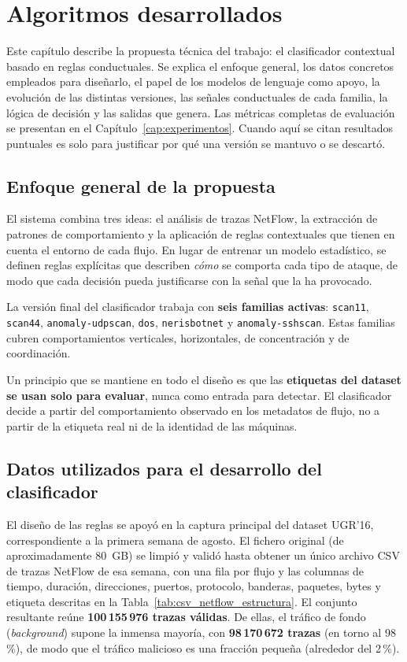 \chapter{Algoritmos desarrollados}
\label{cap:algoritmos}

Este capítulo describe la propuesta técnica del trabajo: el clasificador contextual basado en reglas conductuales. Se explica el enfoque general, los datos concretos empleados para diseñarlo, el papel de los modelos de lenguaje como apoyo, la evolución de las distintas versiones, las señales conductuales de cada familia, la lógica de decisión y las salidas que genera. Las métricas completas de evaluación se presentan en el Capítulo~\ref{cap:experimentos}. Cuando aquí se citan resultados puntuales es solo para justificar por qué una versión se mantuvo o se descartó.

\section{Enfoque general de la propuesta}
\label{sec:alg_enfoque}

El sistema combina tres ideas: el análisis de trazas NetFlow, la extracción de patrones de comportamiento y la aplicación de reglas contextuales que tienen en cuenta el entorno de cada flujo. En lugar de entrenar un modelo estadístico, se definen reglas explícitas que describen \emph{cómo} se comporta cada tipo de ataque, de modo que cada decisión pueda justificarse con la señal que la ha provocado.

La versión final del clasificador trabaja con \textbf{seis familias activas}: \texttt{scan11}, \texttt{scan44}, \texttt{anomaly-udpscan}, \texttt{dos}, \texttt{nerisbotnet} y \texttt{anomaly-sshscan}. Estas familias cubren comportamientos verticales, horizontales, de concentración y de coordinación.

Un principio que se mantiene en todo el diseño es que las \textbf{etiquetas del dataset se usan solo para evaluar}, nunca como entrada para detectar. El clasificador decide a partir del comportamiento observado en los metadatos de flujo, no a partir de la etiqueta real ni de la identidad de las máquinas.

\section{Datos utilizados para el desarrollo del clasificador}
\label{sec:alg_datos}

El diseño de las reglas se apoyó en la captura principal del dataset UGR'16, correspondiente a la primera semana de agosto. El fichero original (de aproximadamente 80~GB) se limpió y validó hasta obtener un único archivo CSV de trazas NetFlow de esa semana, con una fila por flujo y las columnas de tiempo, duración, direcciones, puertos, protocolo, banderas, paquetes, bytes y etiqueta descritas en la Tabla~\ref{tab:csv_netflow_estructura}. El conjunto resultante reúne \textbf{100\,155\,976 trazas válidas}. De ellas, el tráfico de fondo (\emph{background}) supone la inmensa mayoría, con \textbf{98\,170\,672 trazas} (en torno al 98\,\%), de modo que el tráfico malicioso es una fracción pequeña (alrededor del 2\,\%).

